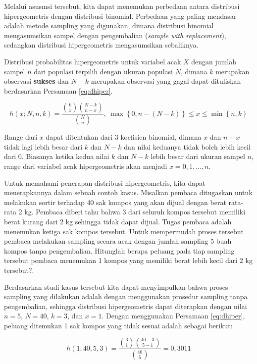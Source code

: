\documentclass[]{book}
\begin{document}
Melalui asusmsi tersebut, kita dapat menemukan perbedaan antara
distribusi hipergeometris dengan distribusi binomial. Perbedaan yang
paling mendasar adalah metode sampling yang digunakan, dimana distribusi
binomial mengasumsikan sampel dengan pengembalian (\emph{sample with
replacement}), sedangkan distribusi hipergeometris mengasumsikan
sebaliknya.

Distribusi probabilitas hipergeometris untuk variabel acak \(X\) dengan
jumlah sampel \(n\) dari populasi terpilih dengan ukuran populasi \(N\),
dimana \(k\) merupakan observasi \textbf{sukses} dan \(N-k\) merupakan
observasi yang gagal dapat dituliskan berdasarkan Persamaan
\eqref{eq:dhiper}.

\begin{equation}
   h\left(x;N,n,k\right)=\frac{\binom{k}{x}\binom{N-k}{n-x}}{\binom{N}{n}},\ \max\left\{0,n-\left(N-k\right)\right\}\le x\le\min\left\{n,k\right\}
  \label{eq:dhiper}
\end{equation}

Range dari \(x\) dapat ditentukan dari 3 koefisien binomial, dimana
\(x\) dan \(n-x\) tidak lagi lebih besar dari \(k\) dan \(N-k\) dan
nilai keduanya tidak boleh lebih kecil dari 0. Biasanya ketika kedua
nilai \(k\) dan \(N-k\) lebih besar dari ukuran sampel \(n\), range dari
variabel acak hipergeometris akan menjadi \(x=0,1,...,n\).

Untuk memahami penerapan distribusi hipergeometris, kita dapat
menerapkannya dalam sebuah contoh kasus. Misalkan pembaca ditugaskan
untuk melakukan sortir terhadap 40 sak kompos yang akan dijual dengan
berat rata-rata 2 kg. Pembaca diberi tahu bahwa 3 dari seluruh kompos
tersebut memiliki berat kurang dari 2 kg sehingga tidak dapat dijual.
Tugas pembaca adalah menemukan ketiga sak kompos tersebut. Untuk
mempermudah proses tersebut pembaca melakukan sampling secara acak
dengan jumlah sampling 5 buah kompos tanpa pengembalian. Hitunglah
berapa peluang pada tiap sampling tersebut pembaca menemukan 1 kompos
yang memiliki berat lebih kecil dari 2 kg tersebut?.

Berdasarkan studi kasus tersebut kita dapat menyimpulkan bahwa proses
sampling yang dilakukan adalah dengan menggunakan prosedur sampling
tanpa pengembalian, sehingga distribusi hipergeometris dapat diterapkan
dengan nilai \(n=5\), \(N=40\), \(k=3\), dan \(x=1\). Dengan menggunakan
Persamaan \eqref{eq:dhiper}, peluang ditemukan 1 sak kompos yang tidak
sesuai adalah sebagai berikut:

\[
h\left(1;40,5,3\right)=\frac{\binom{3}{1}\binom{40-3}{5-1}}{\binom{40}{5}}=0,3011
\]
\end{document}
